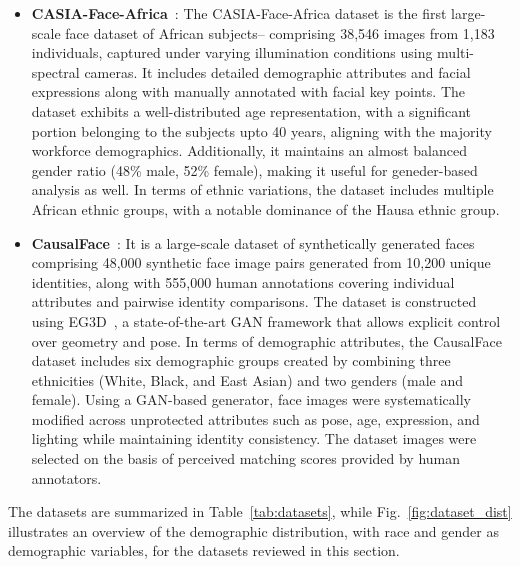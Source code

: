 \begin{itemize}
\item \textbf{CASIA-Face-Africa}~\cite{muhammad2021casia}:
The CASIA-Face-Africa dataset is the first large-scale face dataset of African
subjects-- comprising 38,546 images from 1,183 individuals, captured under
varying illumination conditions using multi-spectral cameras. It includes
detailed demographic attributes and facial expressions along with manually
annotated with facial key points. The dataset exhibits a well-distributed age
representation, with a significant portion belonging to the subjects upto 40
years, aligning with the majority workforce demographics. Additionally, it
maintains an almost balanced gender ratio (48\% male, 52\% female), making it
useful for geneder-based analysis as well. In terms of ethnic variations, the
dataset includes multiple African ethnic groups, with a notable dominance of the
Hausa ethnic group. 

\item \textbf{CausalFace}~\cite{liang2023benchmarking}:
It is a large-scale dataset of synthetically generated faces comprising 48,000
synthetic face image pairs generated from 10,200 unique identities, along with
555,000 human annotations covering individual attributes and pairwise identity
comparisons. The dataset is constructed using EG3D~\cite{chan2022efficient}, a
state-of-the-art GAN framework that allows explicit control over geometry and
pose. In terms of demographic attributes, the CausalFace dataset includes six
demographic groups created by combining three ethnicities (White, Black, and
East Asian) and two genders (male  and female). Using a GAN-based generator,
face images were systematically modified across unprotected attributes such as
pose, age, expression, and lighting while maintaining identity consistency. The
dataset images were selected on the basis of perceived matching scores provided
by human annotators. 

\end{itemize}

The datasets are summarized in Table~\ref{tab:datasets}, while
Fig.~\ref{fig:dataset_dist} illustrates an overview of the demographic
distribution, with race and gender as demographic variables, for the datasets
reviewed in this section.



